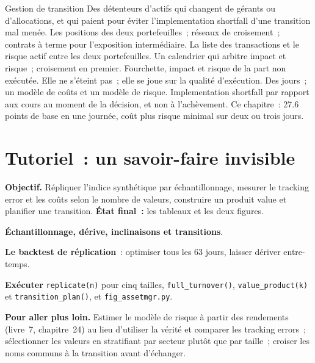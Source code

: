 \begin{strategyfile}{Gestion de transition}\label{strat:s1:the-asset-managers-strategies:transition}
 Des détenteurs d'actifs qui changent de gérants ou d'allocations, et qui paient pour éviter l'implementation shortfall d'une transition mal menée.
 Les positions des deux portefeuilles~; réseaux de croisement~; contrats à terme pour l'exposition intermédiaire.
 La liste des transactions et le risque actif entre les deux portefeuilles.
 Un calendrier qui arbitre impact et risque~; croisement en premier.
 Fourchette, impact et risque de la part non exécutée.
 Elle ne s'éteint pas~; elle se joue sur la qualité d'exécution.
 Des jours~; un modèle de coûts et un modèle de risque.
 Implementation shortfall par rapport aux cours au moment de la décision, et non à l'achèvement.
 Ce chapitre~: 27.6 points de base en une journée, coût plus risque minimal sur deux ou trois jours.
\end{strategyfile}

\section{Tutoriel~: un savoir-faire invisible}\label{tut:s1:the-asset-managers-strategies:tut}

\begin{tutorial}
\textbf{Objectif.} Répliquer l'indice synthétique par échantillonnage, mesurer le tracking error et les coûts selon le nombre de valeurs, construire un produit value et planifier une
transition. \textbf{État final~:} les tableaux et les deux figures.
\begin{tutsteps}
\item \textbf{Échantillonnage, dérive, inclinaisons et transitions}.
\label{lst:s1:the-asset-managers-strategies:sampled}
\item \textbf{Le backtest de réplication}~: optimiser tous les 63 jours, laisser dériver entre-temps.
\label{lst:s1:the-asset-managers-strategies:replicate}
\item \textbf{Exécuter} \texttt{replicate(n)} pour cinq tailles, \texttt{full\_turnover()}, \texttt{value\_product(k)} et \texttt{transition\_plan()}, et
\texttt{fig\_assetmgr.py}.
\end{tutsteps}
\textbf{Pour aller plus loin.} Estimer le modèle de risque à partir des rendements (livre~7, chapitre~24) au lieu d'utiliser la vérité et comparer les tracking errors~; sélectionner
les valeurs en stratifiant par secteur plutôt que par taille~; croiser les noms communs à la transition avant d'échanger.
\end{tutorial}

